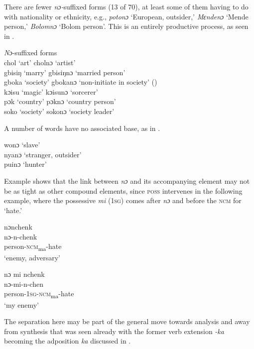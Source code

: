There are fewer \textit{nɔ-}suffixed forms (13 of 70), at least some of them having to do with nationality or ethnicity, e.g., \textit{potonɔ} ‘European, outsider,' \textit{Mɛndenɔ} ‘Mende person,' \textit{Bolomnɔ} ‘Bolom person'. This is an entirely productive process, as seen in .

\TabPositions{1.25cm,4cm,5.75cm,7cm}

\ea%
    \label{ex:179}
    \textit{Nɔ}{}-suffixed forms\\
    \vspace{6pt}
    chol \tab ‘art' \tab cholnɔ \tab ‘artist'\\
    gbisiŋ \tab ‘marry' \tab gbisiŋnɔ \tab ‘married person'\\
    gboka \tab ‘society' \tab gbokanɔ \tab ‘non-initiate in society' (\citealt{Pichl1967})\\
    kɔisu \tab ‘magic' \tab kɔisunɔ \tab ‘sorcerer'\\
    pɔk \tab ‘country' \tab pɔknɔ \tab ‘country person'\\
    soko \tab ‘society' \tab sokonɔ \tab ‘society leader'
\z

A number of words have no associated base, as in .

\ea%
    \label{ex:180}
    wonɔ \tab ‘slave'\\
    nyanɔ \tab ‘stranger, outsider'\\
    puinɔ \tab ‘hunter'\\
\z

Example  shows that the link between \textit{nɔ} and its accompanying element may not be as tight as other compound elements, since \textsc{poss} intervenes in the following example, where the possessive \textit{mi} (\textsc{1sg}) comes after \textit{nɔ} and before the \textsc{ncm} for ‘hate.'

\ea%
    \label{ex:181}
    \ea nɔnchenk\\
    \gll nɔ-n-chenk\\
    person\textsc{{}-ncm}\textsubscript{ma}{}-hate\\
    \glt ‘enemy, adversary'

    \ex nɔ mi nchenk\\
    nɔ-mi-n-chen\\
    person\textsc{{}-1sg-ncm}\textsubscript{ma}{}-hate\\
    \glt ‘my enemy'
\z
\z

\noindent The separation here may be part of the general move towards analysis and away from synthesis that was seen already with the former verb extension \textit{{}-ka} becoming the adposition \textit{ka} discussed in .

